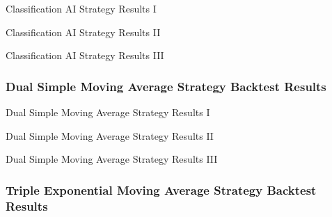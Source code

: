 \cleardoublepage
\begin{table}[H]
    \centering
    \caption{Classification AI Strategy Results I}
\end{table}
\begin{table}[H]
    \centering
    \caption{Classification AI Strategy Results II}
\end{table}
\begin{table}[H]
    \centering
    \caption{Classification AI Strategy Results III}
\end{table}

\subsubsection{Dual Simple Moving Average Strategy Backtest Results}

\begin{table}[H]
    \centering
    \caption{Dual Simple Moving Average Strategy Results I}
\end{table}
\begin{table}[H]
    \centering
    \caption{Dual Simple Moving Average Strategy Results II}
\end{table}
\begin{table}[H]
    \centering
    \caption{Dual Simple Moving Average Strategy Results III}
\end{table}

\subsubsection{Triple Exponential Moving Average Strategy Backtest Results}

